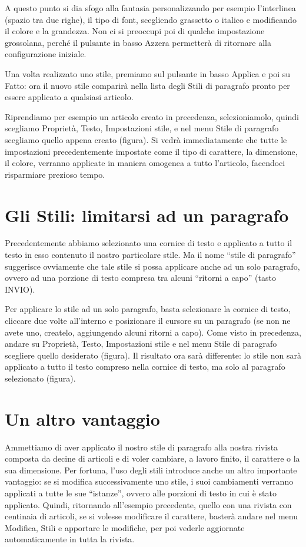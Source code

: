 \documentclass[a4paper, 12pt]{book}
\begin{document}
A questo punto si dia sfogo alla fantasia personalizzando per esempio l'interlinea (spazio tra due righe), il tipo di font, scegliendo grassetto o italico e modificando il colore e la grandezza. Non ci si preoccupi poi di qualche impostazione grossolana, perché il pulsante in basso Azzera permetterà di ritornare alla configurazione iniziale.

Una volta realizzato uno stile, premiamo sul pulsante in basso Applica e poi su Fatto: ora il nuovo stile comparirà nella lista degli Stili di paragrafo pronto per essere applicato a qualsiasi articolo.

Riprendiamo per esempio un articolo creato in precedenza, selezioniamolo, quindi scegliamo Proprietà, Testo, Impostazioni stile, e nel menu Stile di paragrafo scegliamo quello appena creato (figura). Si vedrà immediatamente che tutte le impostazioni precedentemente impostate come il tipo di carattere, la dimensione, il colore, verranno applicate in maniera omogenea a tutto l'articolo, facendoci risparmiare prezioso tempo.

\section{Gli Stili: limitarsi ad un paragrafo}
Precedentemente abbiamo selezionato una cornice di testo e applicato a tutto il testo in esso contenuto il nostro particolare stile. Ma il nome “stile di paragrafo” suggerisce ovviamente che tale stile si possa applicare anche ad un solo paragrafo, ovvero ad una porzione di testo compresa tra alcuni “ritorni a capo” (tasto INVIO).

Per applicare lo stile ad un solo paragrafo, basta selezionare la cornice di testo, cliccare due volte all'interno e posizionare il cursore su un paragrafo (se non ne avete uno, createlo, aggiungendo alcuni ritorni a capo). Come visto in precedenza, andare su Proprietà, Testo, Impostazioni stile  e nel menu Stile di paragrafo scegliere quello desiderato (figura). Il risultato ora sarà differente: lo stile non sarà applicato a tutto il testo compreso nella cornice di testo, ma solo al paragrafo selezionato (figura).

\section{Un altro vantaggio}
Ammettiamo di aver applicato il nostro stile di paragrafo alla nostra rivista composta da decine di articoli e di voler cambiare, a lavoro finito, il carattere o la sua dimensione. Per fortuna, l'uso degli stili introduce anche un altro importante vantaggio: se si modifica successivamente uno stile, i suoi cambiamenti verranno applicati a tutte le sue “istanze”, ovvero alle porzioni di testo in cui è stato applicato. Quindi, ritornando all'esempio precedente, quello con una rivista con centinaia di articoli, se si volesse modificare il carattere, basterà andare nel menu Modifica, Stili e apportare le modifiche, per poi vederle aggiornate automaticamente in tutta la rivista.
\end{document}
